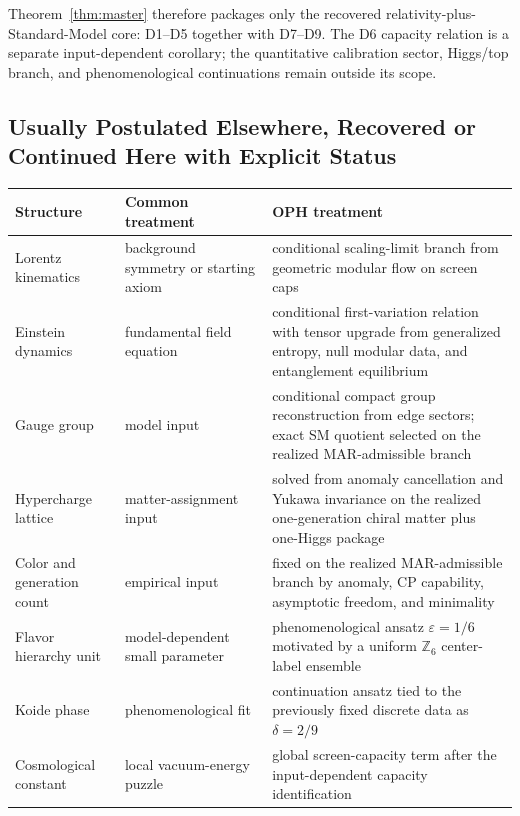 \documentclass[11pt]{article}
\begin{document}
Theorem~\ref{thm:master} therefore packages only the recovered relativity-plus-Standard-Model core: D1--D5 together with D7--D9. The D6 capacity relation is a separate input-dependent corollary; the quantitative calibration sector, Higgs/top branch, and phenomenological continuations remain outside its scope.

\subsection*{Usually Postulated Elsewhere, Recovered or Continued Here with Explicit Status}

\begingroup
\footnotesize
\begin{tabular}{@{}>{\raggedright\arraybackslash}p{}>{\raggedright\arraybackslash}p{}>{\raggedright\arraybackslash}p{}@{}}
\toprule
Structure & Common treatment & OPH treatment \\
\midrule
Lorentz kinematics & background symmetry or starting axiom & conditional scaling-limit branch from geometric modular flow on screen caps \\
Einstein dynamics & fundamental field equation & conditional first-variation relation with tensor upgrade from generalized entropy, null modular data, and entanglement equilibrium \\
Gauge group & model input & conditional compact group reconstruction from edge sectors; exact SM quotient selected on the realized MAR-admissible branch \\
Hypercharge lattice & matter-assignment input & solved from anomaly cancellation and Yukawa invariance on the realized one-generation chiral matter plus one-Higgs package \\
Color and generation count & empirical input & fixed on the realized MAR-admissible branch by anomaly, CP capability, asymptotic freedom, and minimality \\
Flavor hierarchy unit & model-dependent small parameter & phenomenological ansatz \(\varepsilon=1/6\) motivated by a uniform \(\mathbb Z_6\) center-label ensemble \\
Koide phase & phenomenological fit & continuation ansatz tied to the previously fixed discrete data as \(\delta=2/9\) \\
Cosmological constant & local vacuum-energy puzzle & global screen-capacity term after the input-dependent capacity identification \\
\bottomrule
\end{tabular}
\endgroup
\end{document}
